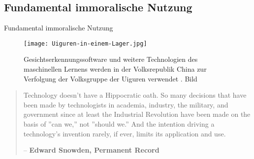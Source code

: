 \documentclass[10pt]{beamer}
\begin{document}

\subsection{Fundamental immoralische Nutzung}
\begin{frame}{Fundamental immoralische Nutzung}
  \begin{figure}
    \texttt{[image: Uiguren-in-einem-Lager.jpg]}
    \caption{Gesichtserkennungssoftware und weitere Technologien des maschinellen Lernens werden in der Volksrepublik China zur Verfolgung der Volksgruppe der Uiguren verwendet \cite{NatureEthicalQuestions}. Bild \cite{WeltUiguren}}
  \end{figure}
\end{frame}

\begin{frame}
  \begin{quote}
    Technology doesn't have a Hippocratic oath. So many decisions that have been made by technologists in academia, industry, the military, and government since at least the Industrial Revolution have been made on the basis of ''can we,'' not ''should we.'' And the intention driving a technology's invention rarely, if ever, limits its application and use. \\ \begin{center} -- \textbf{Edward Snowden, Permanent Record}\cite{PermanentRecord} \end{center}
  \end{quote}
\end{frame}
\end{document}
